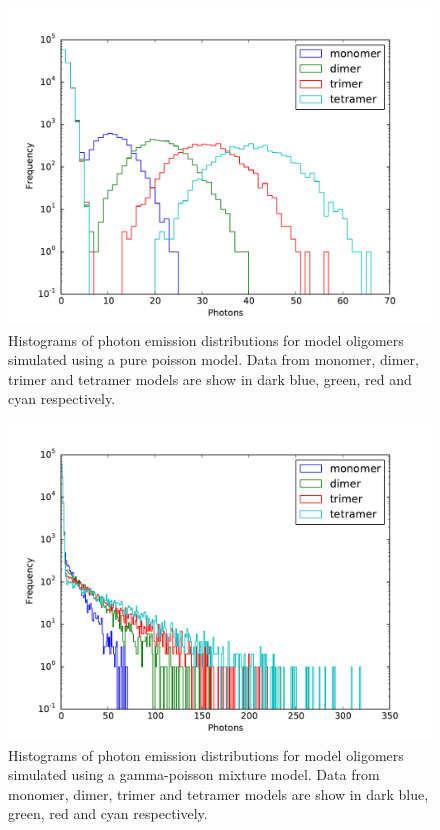 \begin{figure}
   \begin{center}
      \includegraphics*[clip=true, width=6in]{sizing/poisson_oligomers_log.pdf}
      \caption{Histograms of photon emission distributions for model oligomers simulated using a pure poisson model. Data from monomer, dimer, trimer and tetramer models are show in dark blue, green, red and cyan respectively.}
      \label{fig:poisson_oligomers}
   \end{center}
\end{figure}


\begin{figure}
   \begin{center}
      \includegraphics*[clip=true, width=6in]{sizing/gamma_poisson_oligomers_log.pdf}
      \caption{Histograms of photon emission distributions for model oligomers simulated using a gamma-poisson mixture model. Data from monomer, dimer, trimer and tetramer models are show in dark blue, green, red and cyan respectively.}
      \label{fig:gamma_poisson_oligomers}
   \end{center}
\end{figure}




